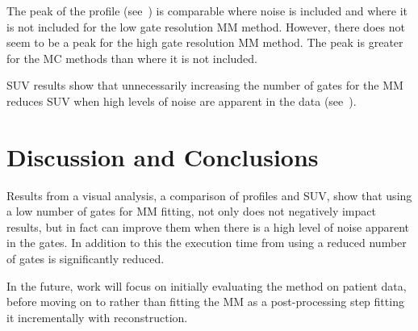     The peak of the profile (see~) is comparable where noise is included and where it is not included for the low gate resolution \gls{MM} method. However, there does not seem to be a peak for the high gate resolution \gls{MM} method. The peak is greater for the \gls{MC} methods than where it is not included.
     
    \gls{SUV} results show that unnecessarily increasing the number of gates for the \gls{MM} reduces \gls{SUV} when high levels of noise are apparent in the data (see~).


\section{Discussion and Conclusions} \label{sec:discussion_and_conclusions}
    Results from a visual analysis, a comparison of profiles and \gls{SUV}, show that using a low number of gates for \gls{MM} fitting, not only does not negatively impact results, but in fact can improve them when there is a high level of noise apparent in the gates. In addition to this the execution time from using a reduced number of gates is significantly reduced.
    
    In the future, work will focus on initially evaluating the method on patient data, before moving on to rather than fitting the \gls{MM} as a post-processing step fitting it incrementally with reconstruction.
    